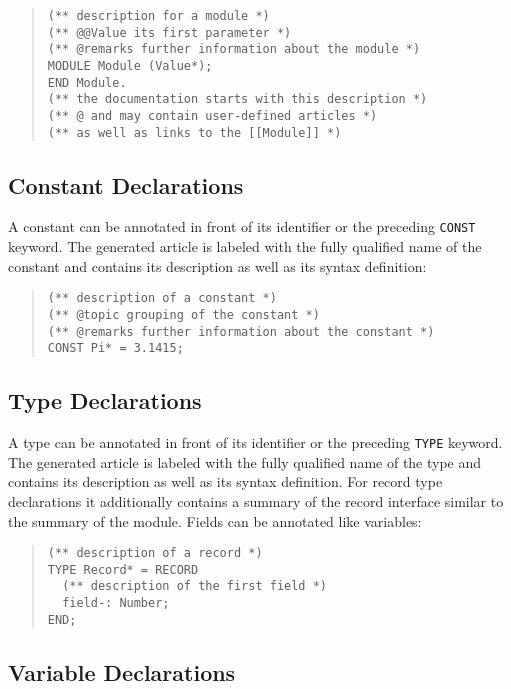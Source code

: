 \begin{quote}\begin{verbatim}
(** description for a module *)
(** @@Value its first parameter *)
(** @remarks further information about the module *)
MODULE Module (Value*);
END Module.
(** the documentation starts with this description *)
(** @ and may contain user-defined articles *)
(** as well as links to the [[Module]] *)
\end{verbatim}\end{quote}

\subsection{Constant Declarations}

A constant can be annotated in front of its identifier or the preceding \texttt{CONST} keyword.
The generated article is labeled with the fully qualified name of the constant and contains its description as well as its syntax definition:

\begin{quote}\begin{verbatim}
(** description of a constant *)
(** @topic grouping of the constant *)
(** @remarks further information about the constant *)
CONST Pi* = 3.1415;
\end{verbatim}\end{quote}

\subsection{Type Declarations}

A type can be annotated in front of its identifier or the preceding \texttt{TYPE} keyword.
The generated article is labeled with the fully qualified name of the type and contains its description as well as its syntax definition.
For record type declarations it additionally contains a summary of the record interface similar to the summary of the module.
Fields can be annotated like variables:

\begin{quote}\begin{verbatim}
(** description of a record *)
TYPE Record* = RECORD
  (** description of the first field *)
  field-: Number;
END;
\end{verbatim}\end{quote}

\subsection{Variable Declarations}

